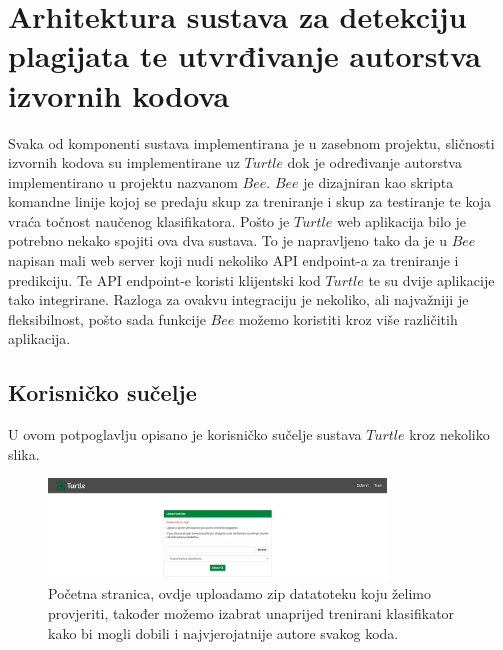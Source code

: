 \chapter{Arhitektura sustava za detekciju plagijata te utvrđivanje autorstva izvornih kodova}

Svaka od komponenti sustava implementirana je u zasebnom projektu, sličnosti izvornih kodova su implementirane uz $Turtle$ dok je određivanje autorstva implementirano u projektu nazvanom $Bee$. $Bee$ je dizajniran kao skripta komandne linije kojoj se predaju skup za treniranje i skup za testiranje te koja vraća točnost naučenog klasifikatora. Pošto je $Turtle$ web aplikacija bilo je potrebno nekako spojiti ova dva sustava. To je napravljeno tako da je u $Bee$ napisan mali web server koji nudi nekoliko API endpoint-a za treniranje i predikciju. Te API endpoint-e koristi klijentski kod $Turtle$ te su dvije aplikacije tako integrirane. Razloga za ovakvu integraciju je nekoliko, ali najvažniji je fleksibilnost, pošto sada funkcije $Bee$ možemo koristiti kroz više različitih aplikacija. 

\section{Korisničko sučelje}

U ovom potpoglavlju opisano je korisničko sučelje sustava $Turtle$ kroz nekoliko slika.


\begin{figure}[htb]
	\centering
	\includegraphics[width=0.8\textwidth,keepaspectratio]{fig/submit.png}
	\caption{Početna stranica, ovdje uploadamo zip datatoteku koju želimo provjeriti, također možemo izabrat unaprijed trenirani klasifikator kako bi mogli dobili i najvjerojatnije autore svakog koda.}
\end{figure}

\newpage
\vspace*{4cm}

